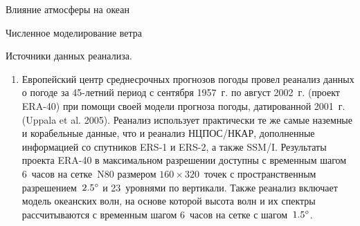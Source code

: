 \begin{chapter}{Влияние атмосферы на океан}
\begin{section}{Численное моделирование ветра}
\begin{paragraph}{Источники данных реанализа.}
\begin{enumerate}
\item
Европейский центр среднесрочных прогнозов погоды провел реанализ данных
о погоде за 45-летний период с сентября 1957~г. по август 2002~г. 
(проект ERA-40) при помощи своей модели прогноза погоды, датированной 
2001~г. (Uppala et al. 2005). Реанализ использует практически те же самые 
наземные и корабельные данные, что и реанализ НЦПОС/НКАР, дополненные 
информацией со спутников ERS-1 и ERS-2, а также SSM/I. Результаты проекта 
ERA-40 в максимальном разрешении доступны с временным шагом 6~часов на 
сетке~N80 размером $160 \times 320$~точек с пространственным 
разрешением~${2.5}^\circ$ и 23~уровнями по вертикали. Также реанализ 
включает модель океанских волн, на основе которой высота волн и их спектры 
рассчитываются с временным шагом 6~часов на сетке с шагом~${1.5}^\circ$.
%
%
\end{enumerate}
\end{paragraph}
\end{section}


\end{chapter}
